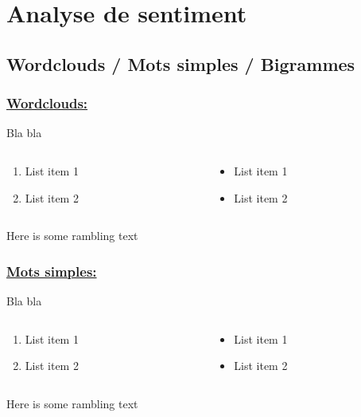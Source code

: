 \documentclass[xcolor=dvipsnames]{beamer}
\begin{document}
	\section*{Analyse de sentiment}
	\subsection*{Wordclouds / Mots simples / Bigrammes}

	\begin{frame}
		\frametitle{\underline{Wordclouds:}}
		Bla bla 
		\begin{columns}
			\begin{column}{0.5\textwidth} %
				\begin{enumerate}
					\item List item 1
					\item List item 2
				\end{enumerate}
			\end{column}
			\begin{column}{0.5\textwidth}
				\begin{itemize}
					\item List item 1
					\item List item 2
				\end{itemize}
			\end{column}
		\end{columns}
		\vspace{\baselineskip}
		Here is some rambling text
	\end{frame}

	\begin{frame}
		\frametitle{\underline{Mots simples:}}
		Bla bla 
		\begin{columns}
			\begin{column}{0.5\textwidth} %
				\begin{enumerate}
					\item List item 1
					\item List item 2
				\end{enumerate}
			\end{column}
			\begin{column}{0.5\textwidth}
				\begin{itemize}
					\item List item 1
					\item List item 2
				\end{itemize}
			\end{column}
		\end{columns}
		\vspace{\baselineskip}
		Here is some rambling text
	\end{frame}
\end{document}
